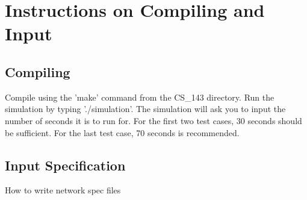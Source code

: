 \documentclass[12pt]{article}
\begin{document}
\appendix
\section{Instructions on Compiling and Input}

\subsection{Compiling}
Compile using the 'make' command from the CS\_143 directory. Run the simulation by typing './simulation'. 
The simulation will ask you to input the number of seconds it is to run for. For the first two test cases, 30 seconds should be sufficient. For the last test case, 70 seconds is recommended.


\subsection{Input Specification}
How to write network spec files
\end{document}
